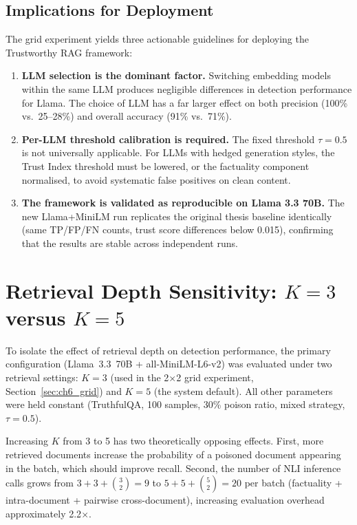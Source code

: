 \subsection{Implications for Deployment}

The grid experiment yields three actionable guidelines for deploying the Trustworthy RAG
framework:

\begin{enumerate}
    \item \textbf{LLM selection is the dominant factor.} Switching embedding models within
    the same LLM produces negligible differences in detection performance for Llama.
    The choice of LLM has a far larger effect on both precision (100\% vs.\ 25--28\%) and
    overall accuracy (91\% vs.\ 71\%).

    \item \textbf{Per-LLM threshold calibration is required.} The fixed threshold $\tau = 0.5$
    is not universally applicable. For LLMs with hedged generation styles, the Trust Index
    threshold must be lowered, or the factuality component normalised, to avoid systematic
    false positives on clean content.

    \item \textbf{The framework is validated as reproducible on Llama 3.3 70B.} The new
    Llama+MiniLM run replicates the original thesis baseline identically (same TP/FP/FN
    counts, trust score differences below 0.015), confirming that the results are stable
    across independent runs.
\end{enumerate}

\section{Retrieval Depth Sensitivity: $K=3$ versus $K=5$}
\label{sec:ch6_topk}

To isolate the effect of retrieval depth on detection performance, the primary configuration
(Llama~3.3~70B + all-MiniLM-L6-v2) was evaluated under two retrieval settings: $K=3$ (used
in the 2×2 grid experiment, Section~\ref{sec:ch6_grid}) and $K=5$ (the system default).
All other parameters were held constant (TruthfulQA, 100 samples, 30\% poison ratio,
mixed strategy, $\tau=0.5$).

Increasing $K$ from 3 to 5 has two theoretically opposing effects. First, more retrieved
documents increase the probability of a poisoned document appearing in the batch, which
should improve recall. Second, the number of NLI inference calls grows from
$3 + 3 + \binom{3}{2} = 9$ to $5 + 5 + \binom{5}{2} = 20$ per batch (factuality +
intra-document + pairwise cross-document), increasing evaluation overhead approximately 2.2$\times$.

